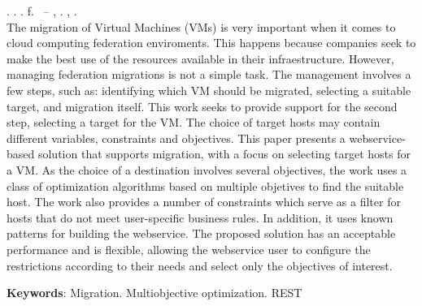 \begin{resumo}[ABSTRACT]
\begin{SingleSpacing}

\imprimirautorcitacao. \imprimirtitleabstract. \imprimirdata. \pageref {LastPage} f. \imprimirprojeto\ – \imprimirprograma, \imprimirinstituicao. \imprimirlocal, \imprimirdata.\\

The migration of Virtual Machines (VMs) is very important when it comes to cloud computing federation enviroments. 
This happens because companies seek to make the best use of the resources available in their infraestructure.
However, managing federation migrations is not a simple task. The management involves a few steps, such as: identifying which VM 
should be migrated, selecting a suitable target, and migration itself.
This work seeks to provide support for the second step, selecting a target for the VM. 
The choice of target hosts may contain different variables, constraints and objectives. 
This paper presents a webservice-based solution that supports migration, with a focus on selecting target hosts for a VM.
As the choice of a destination involves several objectives, the work uses a class of optimization algorithms based on
multiple objetives to find the suitable host. The work also provides a number of constraints
which serve as a filter for hosts that do not meet user-specific business rules.
In addition, it uses known patterns for building the webservice.
The proposed solution has an acceptable performance and is flexible, 
allowing the webservice user to configure the restrictions according to their needs and
select only the objectives of interest.


\textbf{Keywords}: Migration. Multiobjective optimization. REST 

\end{SingleSpacing}
\end{resumo}
